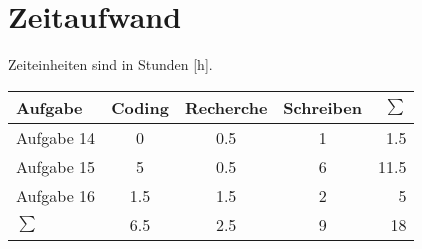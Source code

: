 \section{Zeitaufwand}
Zeiteinheiten sind in Stunden [h].
\begin{table}[h]
    \begin{tabular}{l|ccc|r}
        Aufgabe & Coding & Recherche & Schreiben & $\sum$\\\hline
        Aufgabe 14 & 0 & 0.5 & 1 & 1.5 \\
        Aufgabe 15 & 5 & 0.5 & 6 & 11.5 \\
        Aufgabe 16 & 1.5 & 1.5 & 2 & 5 \\\hline
        $\sum$     & 6.5 & 2.5   & 9 & 18
    \end{tabular}
\end{table}